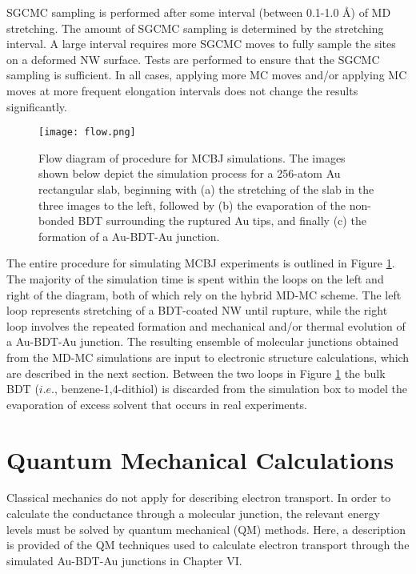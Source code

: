 \documentclass[10pt]{report}  %
\newcommand\findent{\hspace*{\parindent}}
\begin{document}
SGCMC sampling is performed after some interval (between 0.1-1.0 \AA) of MD stretching. The amount of SGCMC sampling is determined by the stretching interval. A large interval requires more SGCMC moves to fully sample the sites on a deformed NW surface. Tests are performed to ensure that the SGCMC sampling is sufficient. In all cases, applying more MC moves and/or applying MC moves at more frequent elongation intervals does not change the results significantly. 

\begin{figure}[h]
	\begin{center}
	\texttt{[image: flow.png]}
	\end{center}
	\caption{Flow diagram of procedure for MCBJ simulations.  The images shown below depict the simulation process for a 256-atom Au rectangular slab, beginning with (a) the stretching of the slab in the three images to the left, followed by (b) the evaporation of the non-bonded BDT surrounding the ruptured Au tips, and finally (c) the formation of a Au-BDT-Au junction.  }
	\label{fig:flow}
\end{figure}

The entire procedure for simulating MCBJ experiments is outlined in Figure \ref{fig:flow}.  The majority of the simulation time is spent within the loops on the left and right of the diagram, both of which rely on the hybrid MD-MC scheme.  The left loop represents stretching of a BDT-coated NW until rupture, while the right loop involves the repeated formation and mechanical and/or thermal evolution of a Au-BDT-Au junction. The resulting ensemble of molecular junctions obtained from the MD-MC simulations are input to electronic structure calculations, which are described in the next section. Between the two loops in Figure \ref{fig:flow} the bulk BDT ($i.e.$, benzene-1,4-dithiol) is discarded from the simulation box to model the evaporation of excess solvent that occurs in real experiments.

\section{Quantum Mechanical Calculations}

\findent Classical mechanics do not apply for describing electron transport.\cite{DiVentra:2000} In order to calculate the conductance through a molecular junction, the relevant energy levels must be solved by quantum mechanical (QM) methods. Here, a description is provided of the QM techniques used to calculate electron transport through the simulated Au-BDT-Au junctions in Chapter VI. 
\end{document}

